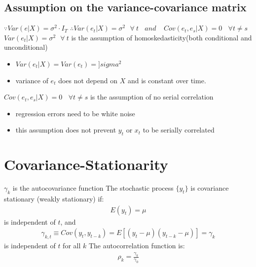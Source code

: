 \documentclass[a4paper,twoside,11pt]{article}
\begin{document}
\subsection{Assumption on the variance-covariance matrix}
\noindent $\because Var(e|X)=\sigma^2 \cdot I_T$ 
\newline
$\therefore Var(e_t |X)=\sigma^2 \ \ \  \forall \ t \ \ \ \ and \ \ \ \ \  Cov(e_t,e_s|X)=0 \ \ \ \ \forall t \ne s$
\newline
\newline
\textcolor{NavyBlue}{$Var(e_t |X)=\sigma^2 \ \ \  \forall \ t$} is the assumption of homoskedasticity(both conditional and unconditional)
\begin{itemize}
    \item $Var(e_t|X)=Var(e_t)=]sigma^2$
    \item variance of $e_t$ does not depend on $X$ and is constant over time. 
\end{itemize}
\textcolor{NavyBlue}{$Cov(e_t,e_s|X)=0 \ \ \ \ \forall t \ne s$} is the assumption of no serial correlation
\begin{itemize}
    \item regression errors need to be \textcolor{NavyBlue}{white noise}
    \item this assumption does not prevent $y_t$ or $x_t$ to be serially correlated
\end{itemize}
\section{Covariance-Stationarity}
\noindent \textcolor{NavyBlue}{$\gamma_k$ is the autocovariance function}
\newline
The stochastic process $\{y_t \}$ is covariance stationary (\textcolor{NavyBlue}{weakly stationary}) if:
\begin{equation*}
\begin{aligned}
   E(y_t) = \mu
\end{aligned}
\end{equation*}
is independent of $t$, and 
\begin{equation*}
\begin{aligned}
\gamma_{k,t} \equiv Cov(y_t, y_{t-k}) = E[(y_t -\mu)(y_{t-k}-\mu)]=\gamma_k
\end{aligned}
\end{equation*}
is independent of $t$ for all $k$
\newline
\textcolor{NavyBlue}{The autocorrelation function is:}
\begin{equation*}
\begin{aligned}
  \rho_k = \frac{\gamma_k}{\gamma_0}
\end{aligned}
\end{equation*}
\end{document}
